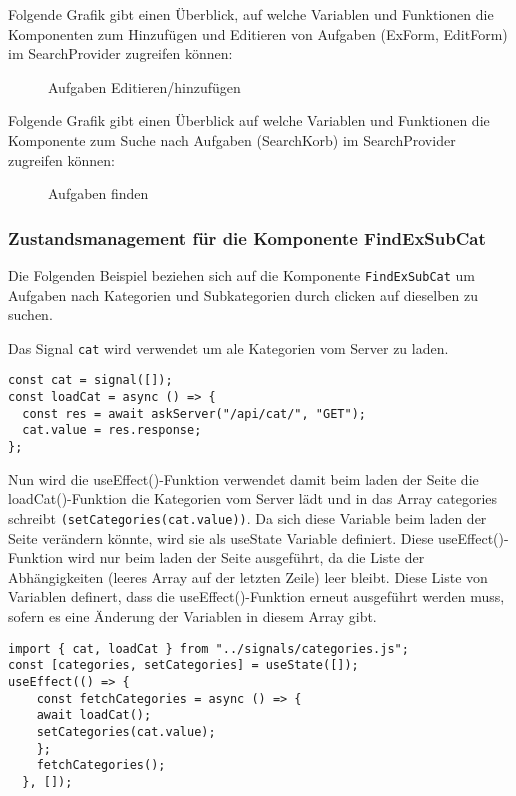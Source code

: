 Folgende Grafik gibt einen Überblick, auf welche Variablen und Funktionen die Komponenten zum Hinzufügen und Editieren von Aufgaben (ExForm, EditForm) im SearchProvider zugreifen können:

\begin{figure}[ht]
\caption{Aufgaben Editieren/hinzufügen \cite{fig:editieren/hinzufuegen}}
\end{figure}


Folgende Grafik gibt einen Überblick auf welche Variablen und Funktionen die Komponente zum Suche nach Aufgaben (SearchKorb) im SearchProvider zugreifen können:
\begin{figure}[ht]
\caption{Aufgaben finden \cite{fig:finden}}
\end{figure}

\subsubsection{Zustandsmanagement für die Komponente FindExSubCat } 
Die Folgenden Beispiel beziehen sich auf die Komponente \texttt{FindExSubCat} um Aufgaben nach Kategorien und Subkategorien durch clicken auf dieselben zu suchen.

Das Signal \texttt{cat} wird verwendet um ale Kategorien vom Server zu laden.

\begin{lstlisting}
const cat = signal([]);
const loadCat = async () => {
  const res = await askServer("/api/cat/", "GET");
  cat.value = res.response;
};

\end{lstlisting}

Nun wird die useEffect()-Funktion verwendet damit beim laden der Seite die loadCat()-Funktion die Kategorien vom Server lädt und in das Array categories schreibt \texttt{(setCategories(cat.value))}. Da sich diese Variable beim laden der Seite verändern könnte, wird sie als useState Variable definiert. 
Diese useEffect()-Funktion wird nur beim laden der Seite ausgeführt, da die Liste der Abhängigkeiten (leeres Array auf der letzten Zeile) leer bleibt. Diese Liste von Variablen definert, dass die useEffect()-Funktion erneut ausgeführt werden muss, sofern es eine Änderung der Variablen in diesem Array gibt.

\begin{lstlisting}
import { cat, loadCat } from "../signals/categories.js";
const [categories, setCategories] = useState([]);
useEffect(() => {
    const fetchCategories = async () => {
    await loadCat();
    setCategories(cat.value);
    };
    fetchCategories();
  }, []);

\end{lstlisting}




